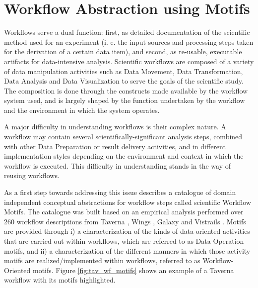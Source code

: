 \section{Workflow Abstraction using Motifs}
\label{sec:abstraction}
Workflows serve a dual function: first, as detailed documentation of the scientific method used for an experiment (i. e. the input sources and processing steps taken for the derivation of a certain data item), and second, as re-usable, executable artifacts for data-intensive analysis. 
Scientific workflows are composed of a variety of data manipulation activities such as Data Movement, Data Transformation, Data Analysis and Data Visualization to serve the goals of the scientific study. The composition is done through the constructs made available by the workflow system used, and is largely shaped by the function undertaken by the workflow and the environment in which the system operates.

A major difficulty in understanding workflows is their complex nature. A workflow may contain several scientifically-significant analysis steps, combined with other Data Preparation or result delivery activities, and in different implementation styles depending on the environment and context in which the workflow is executed. This difficulty in understanding stands in the way of reusing workflows.

As a first step towards addressing this issue \cite{garijo_Alper_2012} describes a catalogue of domain independent conceptual abstractions for workflow steps called scientific Workflow Motifs. The catalogue was built based on an empirical analysis performed over 260 workflow descriptions from Taverna \cite{taverna}, Wings \cite{DBLP:journals/expert/GilRKGGMD11}, Galaxy \cite{Goecks_Nekrutenko_Taylor_2010} and Vistrails \cite{Callahan06-vistrails}. Motifs are provided through i) a characterization of the kinds of data-oriented activities that are carried out within workflows, which are referred to as Data-Operation motifs, and ii) a characterization of the different manners in which those activity motifs are realized/implemented within workflows, referred to as Workflow-Oriented motifs. Figure \ref{fig:tav_wf_motifs} shows an example of a Taverna workflow with its motifs highlighted.

